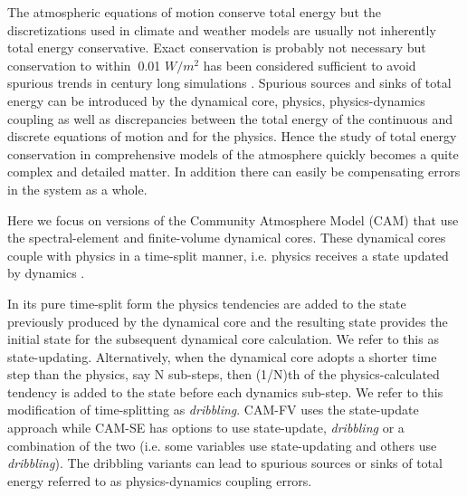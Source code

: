 \documentclass{agujournal}
\begin{document}
The atmospheric equations of motion conserve total energy but the discretizations used in climate and weather models are usually not inherently total energy conservative. Exact conservation is probably not necessary but conservation to within $~$0.01  $W/m^2$ has been considered sufficient to avoid spurious trends in century long simulations \citep{B2000S,WOHTTV2015JAMES}. Spurious sources and sinks of total energy can be introduced by the dynamical core, physics, physics-dynamics coupling as well as discrepancies between the total energy of the continuous and discrete equations of motion and for the physics. Hence the study of total energy conservation in comprehensive models of the atmosphere quickly becomes a quite complex and detailed matter. In addition there can easily be compensating errors in the system as a whole.

Here we focus on versions of the Community Atmosphere Model (CAM) that use the spectral-element \citep[SE, ][]{LetAl2018JAMES} and finite-volume \citep[FV, ][]{L2004MWR} dynamical cores. These dynamical cores couple with physics in a time-split manner, i.e. physics receives a state updated by dynamics \citep[see ][ for a discussion of time-split versus process split physics-dynamics coupling in the context of CAM]{W2002MWR}.

In its pure time-split form the physics tendencies are added to the state previously produced by the dynamical core and the resulting state provides the initial state for the subsequent dynamical core calculation. We refer to this as state-updating. Alternatively, when the dynamical core adopts a shorter time step than the physics, say N sub-steps, then (1/N)th of the physics-calculated tendency is added to the state before each dynamics sub-step. We refer to this modification of time-splitting as {\em{dribbling}}. CAM-FV uses the state-update approach while CAM-SE has options to use state-update, {\em{dribbling}} or a combination of the two (i.e. some variables use state-updating and others use {\em{dribbling}}). The dribbling variants can lead to spurious sources or sinks of total energy referred to as physics-dynamics coupling errors.
\end{document}
